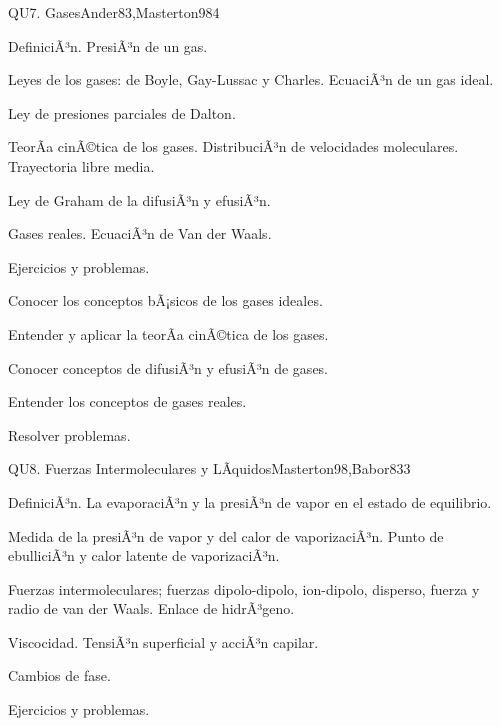 \begin{syllabus}
\begin{unit}{QU7. Gases}{Ander83,Masterton98}{4}
\begin{topics}
      \item DefiniciÃ³n. PresiÃ³n de un gas.
      \item Leyes de los gases: de Boyle, Gay-Lussac y Charles. EcuaciÃ³n de un gas ideal.
      \item Ley de presiones parciales de Dalton.
      \item TeorÃ­a cinÃ©tica de los gases. DistribuciÃ³n de velocidades moleculares. Trayectoria libre media.
      \item Ley de Graham de la difusiÃ³n y efusiÃ³n.
      \item Gases reales. EcuaciÃ³n de Van der Waals.
      \item Ejercicios y problemas.
   \end{topics}

   \begin{unitgoals}
      \item Conocer los conceptos bÃ¡sicos de los gases ideales.
      \item Entender y aplicar la teorÃ­a cinÃ©tica de los gases.
      \item Conocer conceptos de difusiÃ³n y efusiÃ³n de gases.
      \item Entender los conceptos de gases reales.
      \item Resolver problemas.
   \end{unitgoals}
\end{unit}

\begin{unit}{QU8. Fuerzas Intermoleculares y LÃ­quidos}{Masterton98,Babor83}{3}
\begin{topics}
      \item DefiniciÃ³n. La evaporaciÃ³n y la presiÃ³n de vapor en el estado de equilibrio.
      \item Medida de la presiÃ³n de vapor y del calor de vaporizaciÃ³n. Punto de ebulliciÃ³n y calor latente de vaporizaciÃ³n.
      \item Fuerzas intermoleculares; fuerzas dipolo-dipolo, ion-dipolo, disperso, fuerza y radio de van der Waals. Enlace de hidrÃ³geno.
      \item Viscocidad. TensiÃ³n superficial y acciÃ³n capilar.
      \item Cambios de fase.
      \item Ejercicios y problemas.
    \end{topics}


\end{unit}
\end{syllabus}
